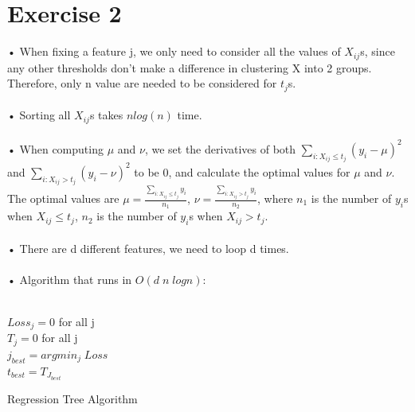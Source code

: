 \documentclass[11pt]{article} %
\begin{document}
\section{Exercise 2}
• When fixing a feature j, we only need  to consider all the values of $X_{ij}$s, since any other thresholds don't make a difference in clustering X into 2 groups. Therefore, only n value are needed to be considered for $t_{j}$s.\\\\ 
• Sorting all $X_{ij}$s takes $nlog(n)$ time.\\\\
• When computing $\mu$ and $\nu$, we set the derivatives of both $\sum_{i:X_{ij}\leq t_{j}}(y_{i}-\mu)^{2}$ and $\sum_{i:X_{ij}> t_{j}}(y_{i}-\nu)^{2}$ to be 0, and calculate the optimal values for $\mu$ and $\nu$. The optimal values are $\mu = \frac{\sum_{i:X_{ij}\leq t_{j}}y_{i}}{n_1}$, $\nu= \frac{\sum_{i:X_{ij}> t_{j}}y_{i}}{n_2}$, where $n_1$ is the number of $y_i$s when $X_{ij}\leq t_{j}$,  $n_2$ is the number of $y_i$s when $X_{ij}> t_{j}$.\\\\
• There are d different features, we need to loop d times.\\\\
• Algorithm that runs in $O(d\;n\;logn)$:\\\\
\begin{algorithm}[H]
$Loss_{j} = 0$ for all j\\
$T_{j} = 0$ for all j\\
 $j_{best} = argmin_{j}\;Loss$\\
 $t_{best} = T_{J_{best}}$
 \caption{Regression Tree Algorithm}
\end{algorithm}
\end{document}
